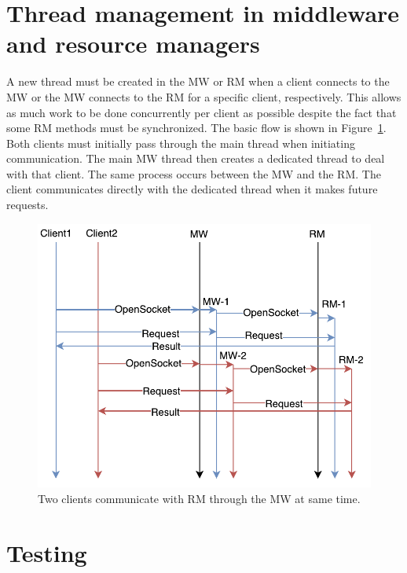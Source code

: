 \documentclass{article}
\begin{document}
 



\section{Thread management in middleware and resource managers}

A new thread must be created in the MW or RM when a client connects to the MW or the MW connects to the RM for a specific client, respectively. This allows as much work to be done concurrently per client as possible despite the fact that some RM methods must be synchronized. The basic flow is shown in Figure~\ref{f:threads}. Both clients must initially pass through the main thread when initiating communication. The main MW thread then creates a dedicated thread to deal with that client. The same process occurs between the MW and the RM. The client communicates directly with the dedicated thread when it makes future requests.

\begin{figure}
\centering
\includegraphics[scale=1]{figures/threads.pdf}
\caption{Two clients communicate with RM through the MW at same time.}
\label{f:threads}
\end{figure} 

\section{Testing}
\end{document}
